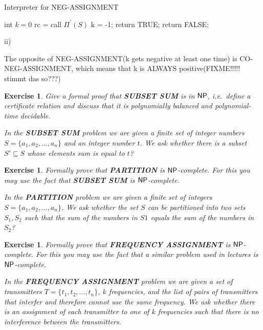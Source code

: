 \documentclass [11pt]{article}
\newtheorem{exercise}[theorem]{Exercise}
\newcommand{\ccfont}[1]{\protect\mathsf{#1}}
\newcommand{\NP}{\ccfont{NP}}
\newcommand{\solution}[1]{\noindent {\bf Solution.}  #1}
\begin{document}
\begin{algorithm}
\caption{Interpreter for NEG-ASSIGNMENT }
\label{intNEG}
\begin{algorithmic}

 \State int $k = 0$
 \State rc = call $\Pi^\prime(S)$
 \State k = -1;
  \State return TRUE;
 \Else
 \State return FALSE;
 \EndIf
\EndFunction

\end{algorithmic}
\end{algorithm}

\solution ii)

The opposite of NEG-ASSIGNMENT(k gets negative at least one time) is CO-NEG-ASSIGNMENT, which means that k is ALWAYS positive(FIXME!!!!! stimmt das so???)

\begin{exercise}
  Give a formal proof that \textbf{SUBSET SUM} is in $\NP$, i.e.\, define a
  certificate relation and discuss that it is polynomially balanced and
  polynomial-time decidable.
  
   \smallskip
    
  \noindent In the \textbf{SUBSET SUM} problem we are given a finite set of integer numbers $S=\{a_1, a_2, \ldots, a_n\}$ and an integer number $t$. We ask whether there is a subset $S'\subseteq S$ whose elements sum is equal to $t$?
  
\end{exercise}




\begin{exercise}
  \label{ex:partition}
  Formally prove that \textbf{PARTITION} is $\NP$-complete. For this you may use
  the fact that \textbf{SUBSET SUM} is $\NP$-complete.   
  
  \smallskip
  \noindent In the \textbf{PARTITION} problem we are given a finite set of integers $S=\{a_1, a_2, \ldots, a_n\}$. We ask whether the set $S$ can be partitioned into two sets $S_1, S_2$ such that the sum of the numbers in $S1$ equals the sum of the numbers in $S_2$? 
  

\end{exercise}




\begin{exercise}
  \label{ex:frequency}
  Formally prove that \textbf{FREQUENCY ASSIGNMENT} is $\NP$-complete. For this you may use
  the fact that a similar problem used in lectures is $\NP$-complete.
      
    \smallskip
        
  \noindent In the \textbf{FREQUENCY ASSIGNMENT} problem we are given a set of transmitters $T=\{t_1, t_2, \ldots, t_n\}$,  $k$ frequencies, and the list of pairs of transmitters that interfer and therefore cannot use the same frequency. We ask whether there is an assignment of each transmitter to one of $k$ frequencies such that there is no interference between the transmitters. 
            
\end{exercise}
\end{document}

